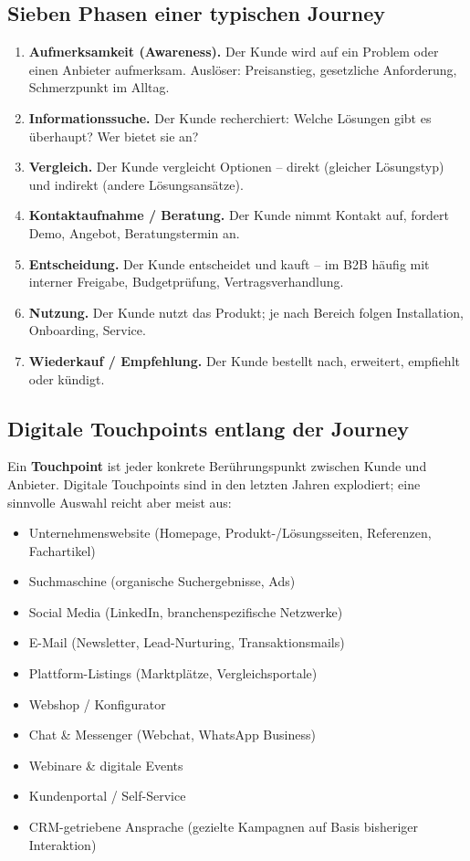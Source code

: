 \documentclass[11pt,a4paper,oneside]{article}
\newcommand{\fachbegriff}[1]{\textbf{#1}}
\begin{document}
\subsection{Sieben Phasen einer typischen Journey}

\begin{enumerate}
  \item \fachbegriff{Aufmerksamkeit (Awareness).} Der Kunde wird auf ein Problem oder einen Anbieter aufmerksam. Auslöser: Preisanstieg, gesetzliche Anforderung, Schmerzpunkt im Alltag.
  \item \fachbegriff{Informationssuche.} Der Kunde recherchiert: Welche Lösungen gibt es überhaupt? Wer bietet sie an?
  \item \fachbegriff{Vergleich.} Der Kunde vergleicht Optionen -- direkt (gleicher Lösungstyp) und indirekt (andere Lösungsansätze).
  \item \fachbegriff{Kontaktaufnahme / Beratung.} Der Kunde nimmt Kontakt auf, fordert Demo, Angebot, Beratungstermin an.
  \item \fachbegriff{Entscheidung.} Der Kunde entscheidet und kauft -- im B2B häufig mit interner Freigabe, Budgetprüfung, Vertragsverhandlung.
  \item \fachbegriff{Nutzung.} Der Kunde nutzt das Produkt; je nach Bereich folgen Installation, Onboarding, Service.
  \item \fachbegriff{Wiederkauf / Empfehlung.} Der Kunde bestellt nach, erweitert, empfiehlt oder kündigt.
\end{enumerate}

\subsection{Digitale Touchpoints entlang der Journey}

Ein \fachbegriff{Touchpoint} ist jeder konkrete Berührungspunkt zwischen Kunde und Anbieter. Digitale Touchpoints sind in den letzten Jahren explodiert; eine sinnvolle Auswahl reicht aber meist aus:

\begin{itemize}
  \item Unternehmenswebsite (Homepage, Produkt-/Lösungsseiten, Referenzen, Fachartikel)
  \item Suchmaschine (organische Suchergebnisse, Ads)
  \item Social Media (LinkedIn, branchenspezifische Netzwerke)
  \item E-Mail (Newsletter, Lead-Nurturing, Transaktionsmails)
  \item Plattform-Listings (Marktplätze, Vergleichsportale)
  \item Webshop / Konfigurator
  \item Chat \& Messenger (Webchat, WhatsApp Business)
  \item Webinare \& digitale Events
  \item Kundenportal / Self-Service
  \item CRM-getriebene Ansprache (gezielte Kampagnen auf Basis bisheriger Interaktion)
\end{itemize}
\end{document}
